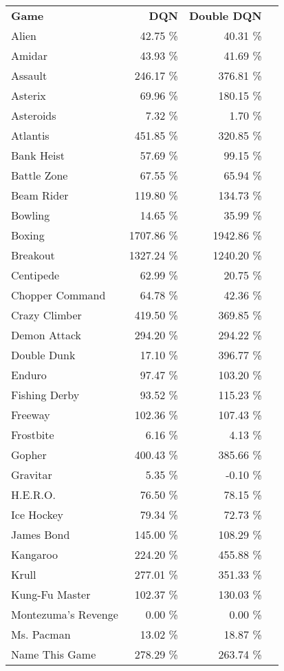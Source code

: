\documentclass[letterpaper]{article}
\begin{document}
\begin{table*}[h]
\centering
\begin{tabular}{lrrr}
\textbf{Game} & \textbf{DQN} & \textbf{Double DQN} \\
Alien & 42.75 \% & 40.31 \% \\
Amidar & 43.93 \% & 41.69 \% \\
Assault & 246.17 \% & 376.81 \% \\
Asterix & 69.96 \% & 180.15 \% \\
Asteroids & 7.32 \% & 1.70 \% \\
Atlantis & 451.85 \% & 320.85 \% \\
Bank Heist & 57.69 \% & 99.15 \% \\
Battle Zone & 67.55 \% & 65.94 \% \\
Beam Rider & 119.80 \% & 134.73 \% \\
Bowling & 14.65 \% & 35.99 \% \\
Boxing & 1707.86 \% & 1942.86 \% \\
Breakout & 1327.24 \% & 1240.20 \% \\
Centipede & 62.99 \% & 20.75 \% \\
Chopper Command & 64.78 \% & 42.36 \% \\
Crazy Climber & 419.50 \% & 369.85 \% \\
Demon Attack & 294.20 \% & 294.22 \% \\
Double Dunk & 17.10 \% & 396.77 \% \\
Enduro & 97.47 \% & 103.20 \% \\
Fishing Derby & 93.52 \% & 115.23 \% \\
Freeway & 102.36 \% & 107.43 \% \\
Frostbite & 6.16 \% & 4.13 \% \\
Gopher & 400.43 \% & 385.66 \% \\
Gravitar & 5.35 \% & -0.10 \% \\
H.E.R.O. & 76.50 \% & 78.15 \% \\
Ice Hockey & 79.34 \% & 72.73 \% \\
James Bond & 145.00 \% & 108.29 \% \\
Kangaroo & 224.20 \% & 455.88 \% \\
Krull & 277.01 \% & 351.33 \% \\
Kung-Fu Master & 102.37 \% & 130.03 \% \\
Montezuma's Revenge & 0.00 \% & 0.00 \% \\
Ms. Pacman & 13.02 \% & 18.87 \% \\
Name This Game & 278.29 \% & 263.74 \% \\

\end{tabular}
\end{table*}
\end{document}
